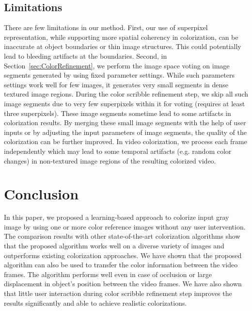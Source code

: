 \documentclass[twocolumn]{svjour3}          %
\begin{document}
\subsection{Limitations}
There are few limitations in our method. First, our use of superpixel representation, while supporting more spatial coherency in colorization, can be inaccurate at object boundaries or thin image structures. This could potentially lead to bleeding artifacts at the boundaries. Second, in Section~\ref{sec:ColorRefinement},  we perform the image space voting on image segments generated by using fixed parameter settings. While such parameters settings work well for few images, it generates very small segments in dense textured image regions. During the color scribble refinement step, we skip all such image segments due to very few superpixels within it for voting (requires at least three superpixels). These image segments sometime lead to some artifacts in colorization results. By merging these small image segments with the help of user inputs or by adjusting the input parameters of image segments, the quality of the colorization can be further improved.  In video colorization, we process each frame independently which may lead to some temporal artifacts (e.g. random color changes) in non-textured image regions of the resulting colorized video.

\section{Conclusion}
\label{sec:5}
In this paper, we proposed a learning-based approach to colorize input gray image by using one or more color reference images without any user intervention. The comparison results with other state-of-the-art colorization algorithms show that the proposed algorithm works well on a diverse variety of images and outperforms existing colorization approaches. We have shown that the proposed algorithm can also be used to transfer the color information between the video frames. The algorithm performs well even in case of occlusion or large displacement in object's position between the video frames. We have also shown that little user interaction during color scribble refinement step improves the results significantly and able to achieve realistic colorizations. 
\end{document}
